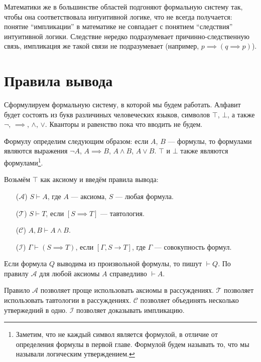 Математики же
в большинстве областей подгоняют формальную систему так,
чтобы она соответствовала интуитивной логике,
что не всегда получается: понятие ``импликации'' в математике не совпадает
с понятием ``следствия'' интуитивной логики. Следствие
нередко подразумевает причинно-следственную
связь, импликация же такой связи не подразумевает (например, ${p\implies(q\implies p)}$).

\section{Правила вывода}

Сформулируем формальную систему, в которой мы будем работать.
Алфавит будет состоять из букв различиных человеческих языков, символов $\top$,
$\bot$, а также $\lnot$, $\implies$, $\land$, $\lor$. Кванторы и равенство пока
что вводить не будем.

Формулу определим следующим образом: если $A$, $B$ --- формулы, то формулами
являются выражения $\lnot A$, ${A\implies B}$, $A\land B$, $A\lor B$.
$\top$ и $\bot$ также являются формулами\footnote{
	Заметим, что не каждый символ является формулой, в отличие от определения
	формулы в первой главе. Формулой будем называть то, что мы называли
	логическим утверждением.
}.

Возьмём $\top$ как аксиому и введём правила вывода:

\newcommand\taut{$\mathcal T$}
\newcommand\axiom{$\mathcal A$}
\newcommand\conj{$\mathcal C$}
\newcommand\implic{$\mathcal I$}
\begin{enumerate}
	\item[(\axiom)]{}$S\vdash A$, где $A$ --- аксиома, $S$ --- любая формула.
	\item[(\taut)]{}$S\vdash T$, если ${[S\implies T]}$ --- тавтология.
	\item[(\conj)]{}$A,B\vdash A\land B$.
	\item[(\implic)]{}${\Gamma\vdash (S\implies T)}$, если $[\Gamma,S\to T]$, где $\Gamma$
	--- совокупность формул.
\end{enumerate}

\pagebreak

Если формула $Q$ выводима из произвольной формулы, то пишут $\vdash Q$.
По правилу \axiom{} для любой аксиомы $A$ справедливо $\vdash A$.

Правило \axiom{} позволяет проще использовать аксиомы в рассуждениях.
\taut{} позволяет использовать тавтологии в рассуждениях.
\conj{} позволяет объединять несколько утвержедний в одно.
\implic{} позволяет доказывать импликацию.

